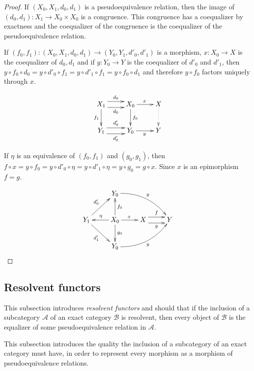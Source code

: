 \documentclass[sort&compress]{elsarticle}
\theoremstyle{plain}
\theoremstyle{definition}
\theoremstyle{remark}
\newcommand\hide[1]{}
\newcommand\cat\mathcal
\begin{document}
\begin{proof} If $(X_0,X_1,d_0,d_1)$ is a pseudoequivalence relation, then the image of $(d_0,d_1):X_1\to X_0\times X_0$ is a congruence. This congruence has a coequalizer by exactness and the coequalizer of the congruence is the coequalizer of the pseudoequivalence relation.

If $(f_0,f_1):(X_0,X_1,d_0,d_1) \to (Y_0,Y_1,d'_0,d'_1)$ is a morphism, $x:X_0 \to X$ is the coequalizer of $d_0,d_1$ and if $y:Y_0 \to Y$ is the coequalizer of $d'_0$ and $d'_1$, then $y\circ f_0\circ d_0 = y\circ d'_0 \circ f_1 = y\circ d'_1\circ f_1 = y\circ f_0 \circ d_1$ and therefore $y\circ f_0$ factors uniquely through $x$.

\[ \xymatrix{
X_1 \ar[d]_{f_1} \ar@<-1ex>[r]_{d_0}\ar@<1ex>[r]^{d_0} & X_0\ar[d]^{f_0} \ar[r]^x & X\ar@{.>}[d] \\
Y_1 \ar@<-1ex>[r]_{d'_0}\ar@<1ex>[r]^{d'_0} & Y_0 \ar[r]_y & Y \\
}\]


If $\eta$ is an equivalence of $(f_0,f_1)$ and $(g_0,g_1)$, then $f\circ x = y\circ f_0  = y \circ d'_0\circ \eta = y\circ d'_1\circ \eta = y\circ g_0 = g\circ x$. Since $x$ is an epimorphism $f=g$.
\hide{\[ \xymatrix{
Y_1 \ar[rrr]_{d'_0}\ar[dd]^{d'_1} &  && Y_0\ar[dd]^y \\
& X_0 \ar[urr]^{f_0} \ar[ul]|\eta \ar[dl]_{g_0}\ar[r]^x & X \ar@<1ex>[dr]^f\ar@<-1ex>[dr]_g\\
Y_0 \ar[rrr]_y&  && Y
}\]}
\[ \xymatrix{
& Y_0\ar@/^3ex/[drr]^y \\
Y_1\ar[ur]^{d'_0}\ar[dr]_{d'_1} & X_0\ar[l]_\eta \ar[u]_{f_0}\ar[d]^{g_0} \ar[r]^x & X \ar@<1ex>[r]^f\ar@<-1ex>[r]_g & Y \\
& Y_0\ar@/_3ex/[urr]_y
}\]
\end{proof}


\subsection{Resolvent functors}
This subsection introduces \emph{resolvent functors} and should that if the inclusion of a subcategory $\cat A$ of an exact category $\cat B$ is resolvent, then every object of $\cat B$ is the equalizer of some pseudoequivalence relation in $\cat A$.

This subsection introduces the quality the inclusion of a subcategory of an exact category must have, in order to represent every morphism as a morphism of pseudoequivalence relations.
\end{document}
